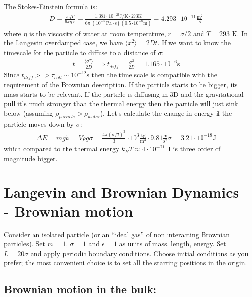 \documentclass[../main.tex]{subfiles}
\begin{document}
The Stokes-Einstein formula is:
\begin{align}
    D = \frac{k_B T}{6\pi\eta\ r} = \frac{1.381 \cdot 10^{-23}\text{J/K} \cdot 293 \text{K}}{6 \pi\  (10^{-3}\ \text{Pa}\cdot\text{s})(0.5\cdot 10^{-8} \text{m})} = 4.293\cdot 10^{-11} \frac{\text{m}^2}{\text{s}}
\end{align} where $\eta$ is the viscosity of water at room temperature, $r = \sigma/2$ and $T=293$ K.
In the Langevin overdamped case, we have $\langle x^2\rangle = 2Dt$. If we want to know the timescale for the particle to diffuse to a distance of $\sigma$:
\begin{align}
    t = \frac{\langle \sigma^2\rangle}{2D} \implies t_{diff}= \frac{ \sigma^2}{2D} = 1.165 \cdot 10^{-6}\text{s}
\end{align}Since $t_{diff} >> \tau_{coll} \sim 10^{-12}\text{s}$  then the time scale is compatible with the requirement of the Brownian description. If the particle starts to be bigger, its mass starts to be relevant. If the particle is diffusing in 3D and the gravitational pull it's much stronger than the thermal energy then the particle will just sink below (assuming $\rho_{particle} > \rho_{water}$). Let's calculate the change in energy if the particle moves down by $\sigma$:
\begin{align}
    \Delta E = mgh = V \rho g \sigma = \frac{4\pi (\sigma/2)^3}{3} \cdot 10^3\frac{\text{kg}}{\text{m}^3} \cdot 9.81 \frac{\text{m}}{\text{s}^2} \sigma = 3.21 \cdot 10^{-18}\text{J}
\end{align} which compared to the thermal energy $k_B T\approx 4 \cdot 10^{-21}$ J is three order of magnitude bigger.

\newpage
\section{Langevin and Brownian Dynamics - Brownian motion}

Consider an isolated particle (or an “ideal gas” of non interacting Brownian particles). Set $m=1$, $\sigma=1$ and $\epsilon=1$ as units of mass, length, energy. Set $L=20\sigma$ and apply periodic boundary conditions. Choose initial conditions as you prefer; the most convenient choice is to set all the starting positions in the origin.

\subsection*{Brownian motion in the bulk:}
\end{document}
